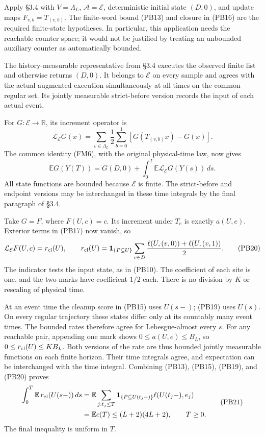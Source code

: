 \documentclass[
  11pt,
  a4paper,
]{article}
\begin{document}
Apply §3.4 with \(V=\Lambda_L\), \(\mathcal A=\mathcal E\),
deterministic initial state \((D,0)\), and update maps
\(F_{v,b}=T_{(v,b)}\). The finite-word bound (PB13) and closure in
(PB16) are the required finite-state hypotheses. In particular, this
application needs the reachable counter space; it would not be justified
by treating an unbounded auxiliary counter as automatically bounded.

The history-measurable representative from §3.4 executes the observed
finite list and otherwise returns \((D,0)\). It belongs to
\(\mathcal E\) on every sample and agrees with the actual augmented
execution simultaneously at all times on the common regular set. Its
jointly measurable strict-before version records the input of each
actual event.

For \(G:\mathcal E\to\mathbb R\), its increment operator is \[
\mathcal L_{\mathcal E}G(x)
=\sum_{v\in\Lambda_L}\frac12\sum_{b=0}^1
 [G(T_{(v,b)}x)-G(x)].
\tag{PB17}
\] The common identity (FM6), with the original physical-time law, now
gives \[
\mathbb E G(Y(T))
=G(D,0)+\int_0^T\mathbb E\mathcal L_{\mathcal E}G(Y(s))\,ds.
\tag{PB19}
\] All state functions are bounded because \(\mathcal E\) is finite. The
strict-before and endpoint versions may be interchanged in these time
integrals by the final paragraph of §3.4.

Take \(G=F\), where \(F(U,c)=c\). Its increment under \(T_e\) is exactly
\(a(U,e)\). Exterior terms in (PB17) now vanish, so \[
\mathcal L_{\mathcal E}F(U,c)=r_{\rm cl}(U),
\qquad
r_{\rm cl}(U)
=\mathbf1_{\{P\subseteq U\}}
\sum_{v\in D}\frac{\ell(U,(v,0))+\ell(U,(v,1))}{2}.
\tag{PB20}
\] The indicator tests the input state, as in (PB10). The coefficient of
each site is one, and the two marks have coefficient \(1/2\) each. There
is no division by \(K\) or rescaling of physical time.

At an event time the cleanup score in (PB15) uses \(U(s-)\); (PB19) uses
\(U(s)\). On every regular trajectory these states differ only at its
countably many event times. The bounded rates therefore agree for
Lebesgue-almost every \(s\). For any reachable pair, appending one mark
shows \(0\leq a(U,e)\leq B_L\), so \(0\leq r_{\rm cl}(U)\leq K B_L\).
Both versions of the rate are thus bounded jointly measurable functions
on each finite horizon. Their time integrals agree, and expectation can
be interchanged with the time integral. Combining (PB13), (PB15),
(PB19), and (PB20) proves \[
\begin{aligned}
\int_0^T\mathbb E\,r_{\rm cl}(U(s-))\,ds
&=\mathbb E\sum_{j:t_j\leq T}
  \mathbf1_{\{P\subseteq U(t_j-)\}}\ell(U(t_j-),e_j)\\
&=\mathbb E c(T)
\leq(L+2)(4L+2),\qquad T\geq0.
\end{aligned}
\tag{PB21}
\] The final inequality is uniform in \(T\).
\end{document}

